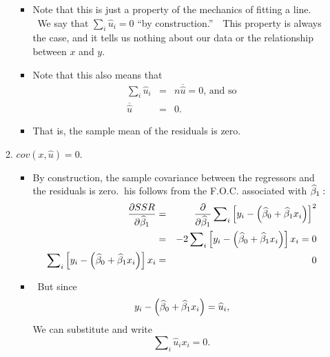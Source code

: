 \documentclass[11pt]{article}
\begin{document}
\begin{itemize}
\begin{enumerate}
\begin{itemize}
\item Note that this is just a property of the mechanics of fitting a line.
\ We say that $\sum\nolimits_{i}\widehat{u}_{i}=0$ \textquotedblleft by
construction.\textquotedblright\ \ This property is always the case, and it
tells us nothing about our data or the relationship between $x$ and $y$.

\item Note that this also means that 
\begin{eqnarray*}
\sum\nolimits_{i}\widehat{u}_{i} &=&n\overline{\widehat{u}}=0\text{, and so}
\\
\overline{\widehat{u}} &=&0.
\end{eqnarray*}

\item That is, the sample mean of the residuals is zero.
\end{itemize}

\item $cov(x,\widehat{u})=0.$

\begin{itemize}
\item By construction, the sample covariance between the regressors and the
residuals is zero. $\ $his follows from the F.O.C. associated with $\widehat{%
\beta }_{1}:$%
\begin{eqnarray*}
\frac{\partial SSR}{\partial \widehat{\beta }_{1}} &=&\frac{\partial }{%
\partial \widehat{\beta }_{1}}\sum\nolimits_{i}\left[ y_{i}-\left( \widehat{%
\beta }_{0}+\widehat{\beta }_{1}x_{i}\right) \right] ^{2} \\
&=&-2\sum\nolimits_{i}\left[ y_{i}-\left( \widehat{\beta }_{0}+\widehat{%
\beta }_{1}x_{i}\right) \right] x_{i}=0 \\
\sum\nolimits_{i}\left[ y_{i}-\left( \widehat{\beta }_{0}+\widehat{\beta }%
_{1}x_{i}\right) \right] x_{i} &=&0
\end{eqnarray*}

\item \ But since%
\begin{equation*}
y_{i}-\left( \widehat{\beta }_{0}+\widehat{\beta }_{1}x_{i}\right) =\widehat{%
u}_{i},
\end{equation*}%
We can substitute and write%
\begin{equation*}
\sum\nolimits_{i}\widehat{u}_{i}x_{i}=0.
\end{equation*}


\end{itemize}
\end{enumerate}
\end{itemize}
\end{document}
